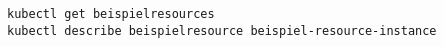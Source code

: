\begin{verbatim}
kubectl get beispielresources
kubectl describe beispielresource beispiel-resource-instance
\end{verbatim}